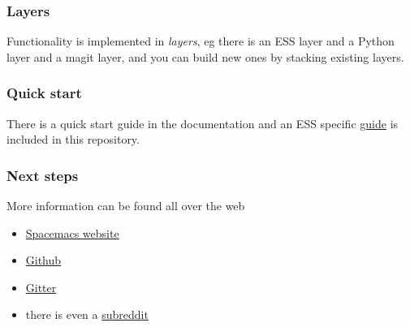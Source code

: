 \documentclass[presentation]{beamer}
\begin{document}
  \begin{frame}
    \frametitle{Layers}
    Functionality is implemented in \emph{layers}, eg there is an ESS layer and
    a Python layer and a magit layer, and you can build new ones by stacking
    existing layers.
  \end{frame}

  
  \begin{frame}
    \frametitle{Quick start}
    There is a quick start guide in the documentation and an ESS specific
    \href{https://github.com/ess-intro/presentation-ess-from-spacemacs/tree/main/presentation}{guide}
    is included in this repository.
  \end{frame}

  \begin{frame}
    \frametitle{Next steps}
    More information can be found all over the web
    \begin{itemize}
    \item \href{https://www.spacemacs.org/}{Spacemacs website}
    \item \href{https://github.com/syl20bnr/spacemacs}{Github}
    \item \href{https://gitter.im/syl20bnr/spacemacs}{Gitter}
    \item there is even a \href{https://www.reddit.com/r/spacemacs/}{subreddit}
    \end{itemize}
  \end{frame}
  
\end{document}

